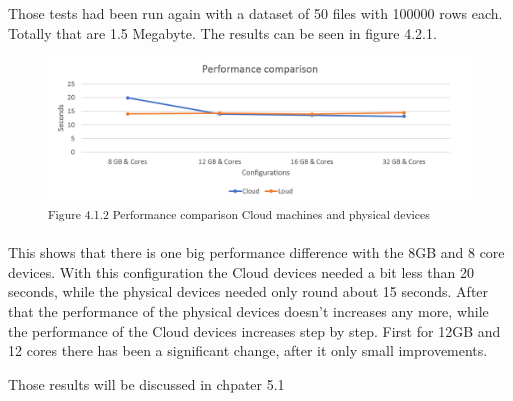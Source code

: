 Those tests had been run again with a dataset of 50 files with 100000 rows each. Totally that are 1.5 Megabyte. The results can be seen in figure 4.2.1.

\begin{figure}[h]
\centering
\includegraphics[width=\textwidth]{images/performance_comparison.png}
\textsuperscript{Figure 4.1.2 Performance comparison Cloud machines and physical devices}
\end{figure}

This shows that there is one big performance difference with the 8GB and 8 core devices. With this configuration the Cloud devices needed a bit less than 20 seconds, while the physical devices needed only round about 15 seconds. After that the performance of the physical devices doesn't increases any more, while the performance of the Cloud devices increases step by step. First for 12GB and 12 cores there has been a significant change, after it only small improvements.

Those results will be discussed in chpater 5.1